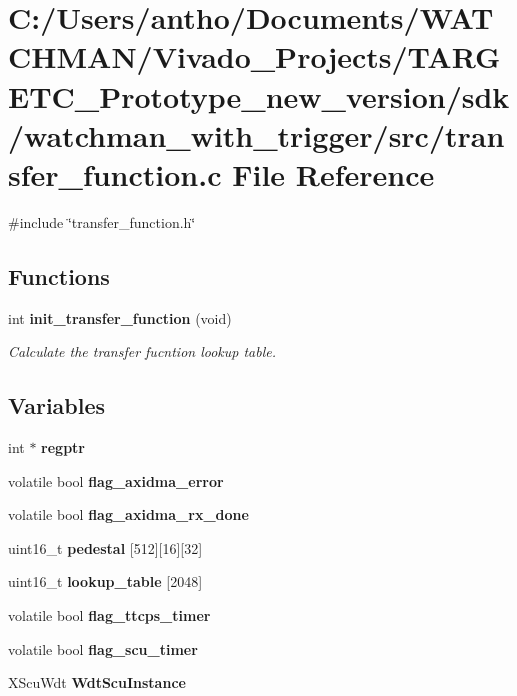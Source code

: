 \section{C\+:/\+Users/antho/\+Documents/\+W\+A\+T\+C\+H\+M\+A\+N/\+Vivado\+\_\+\+Projects/\+T\+A\+R\+G\+E\+T\+C\+\_\+\+Prototype\+\_\+new\+\_\+version/sdk/watchman\+\_\+with\+\_\+trigger/src/transfer\+\_\+function.c File Reference}
\label{transfer__function_8c}
{\ttfamily \#include \char`\"{}transfer\+\_\+function.\+h\char`\"{}}\newline
\subsection*{Functions}
\begin{DoxyCompactItemize}
\item 
int \textbf{ init\+\_\+transfer\+\_\+function} (void)
\begin{DoxyCompactList}\small\item\em Calculate the transfer fucntion lookup table. \end{DoxyCompactList}\end{DoxyCompactItemize}
\subsection*{Variables}
\begin{DoxyCompactItemize}
\item 
\mbox{\label{transfer__function_8c_a39d2cad95814eb9635cca5310d914893}} 
int $\ast$ {\bfseries regptr}
\item 
\mbox{\label{transfer__function_8c_a226727c48b3bfd0888096614ee551f89}} 
volatile bool {\bfseries flag\+\_\+axidma\+\_\+error}
\item 
\mbox{\label{transfer__function_8c_af3d0d90fb2e8215cab44c4a6c6c268fc}} 
volatile bool {\bfseries flag\+\_\+axidma\+\_\+rx\+\_\+done}
\item 
\mbox{\label{transfer__function_8c_a9f38c959b992d18ac787045dc9d4a7ab}} 
uint16\+\_\+t {\bfseries pedestal} [512][16][32]
\item 
\mbox{\label{transfer__function_8c_a9cd595582843e993d6f235d13e0882f5}} 
uint16\+\_\+t {\bfseries lookup\+\_\+table} [2048]
\item 
\mbox{\label{transfer__function_8c_ae1142987fecfa0c02e7edfb9f539805b}} 
volatile bool {\bfseries flag\+\_\+ttcps\+\_\+timer}
\item 
\mbox{\label{transfer__function_8c_a92815e63a8bb041c9594c7229d49cd89}} 
volatile bool {\bfseries flag\+\_\+scu\+\_\+timer}
\item 
\mbox{\label{transfer__function_8c_afd1f6e74a3d4d317436684e7fa64a8fa}} 
X\+Scu\+Wdt {\bfseries Wdt\+Scu\+Instance}
\end{DoxyCompactItemize}


